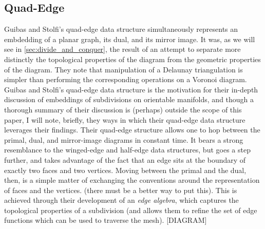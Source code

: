 \documentclass[12pt,twoside]{reedthesis}
\begin{document}
    \subsection{Quad-Edge}
    \label{subsec:quad_edge}
      Guibas and Stolfi's quad-edge data structure simultaneously represents an embdedding of a planar graph, its dual, and its mirror image. It was, as we will see in \cref{sec:divide_and_conquer}, the result of an attempt to separate more distinctly the topological properties of the diagram from the geometric properties of the diagram. They note that manipulation of a Delaunay triangulation is simpler than performing the corresponding operations on a Voronoi diagram.
      Guibas and Stolfi's quad-edge data structure is the motivation for their in-depth discussion of embeddings of subdivisions on orientable manifolds, and though a thorough summary of their discussion is (perhaps) outside the scope of this paper, I will note, briefly, they ways in which their quad-edge data structure leverages their findings. Their quad-edge structure allows one to hop between the primal, dual, and mirror-image diagrams in constant time. It bears a strong resemblance to the winged-edge and half-edge data structures, but goes a step further, and takes advantage of the fact that an edge sits at the boundary of exactly two faces and two vertices. Moving between the primal and the dual, then, is a simple matter of exchanging the conventions around the representation of faces and the vertices. (there must be a better way to put this). This is achieved through their development of an \emph{edge algebra}, which captures the topological properties of a subdivision (and allows them to refine the set of edge functions which can be used to traverse the mesh). [DIAGRAM]

  
  

\end{document}
